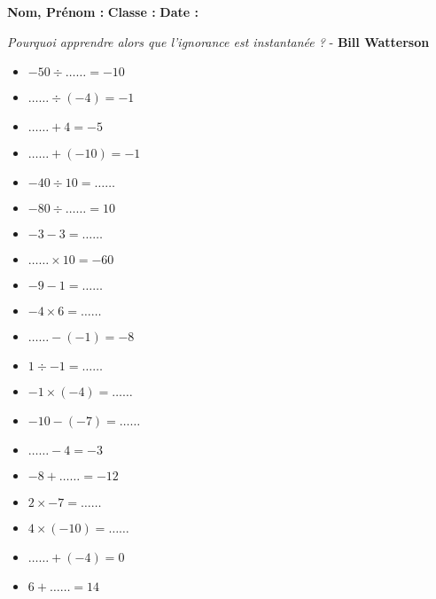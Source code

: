 



\textbf{Nom, Prénom :} \hspace{8cm} \textbf{Classe :} \hspace{3cm} \textbf{Date :}\\

\vspace{-0.5cm} \begin{center}
  \textit{Pourquoi apprendre alors que l’ignorance est instantanée ?}  - \textbf{ Bill Watterson}
\end{center}  \vspace{-0.5cm} 

\begin{multicols}{3}\noindent
    \begin{itemize}[label={$\bullet$}]
        \item $-50 \div \ldots\ldots = -10$
        \item $\ldots\ldots \div \left( -4\right) = -1$
        \item $\ldots\ldots + 4 = -5$
        \item $\ldots\ldots + \left( -10\right) = -1$
        \item $-40 \div 10 = \ldots\ldots$
        \item $-80 \div \ldots\ldots = 10$
        \item $-3 - 3 = \ldots\ldots$
        \item $\ldots\ldots \times 10 = -60$
        \item $-9 - 1 = \ldots\ldots$
        \item $-4 \times 6 = \ldots\ldots$
        \item $\ldots\ldots - \left( -1\right) = -8$
        \item $1 \div -1 = \ldots\ldots$
        \item $-1 \times \left( -4\right) = \ldots\ldots$
        \item $-10 - \left( -7\right) = \ldots\ldots$
        \item $\ldots\ldots - 4 = -3$
        \item $-8 + \ldots\ldots = -12$
        \item $2 \times -7 = \ldots\ldots$
        \item $4 \times \left( -10\right) = \ldots\ldots$
        \item $\ldots\ldots + \left( -4\right) = 0$
        \item $6 + \ldots\ldots = 14$
    \end{itemize}
  \end{multicols}

